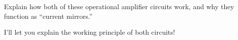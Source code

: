 Explain how both of these operational amplifier circuits work, and why they function as ``current mirrors.''







I'll let you explain the working principle of both circuits!











